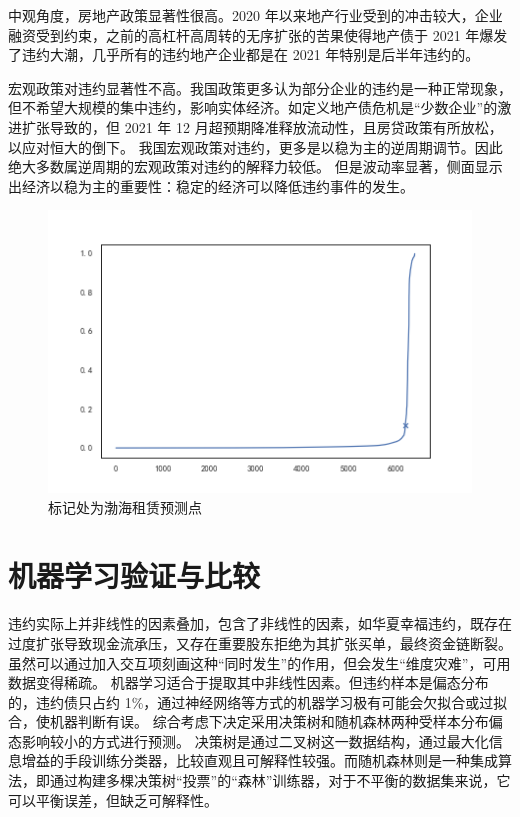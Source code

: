 中观角度，房地产政策显著性很高。2020 年以来地产行业受到的冲击较大，企业融资受到约束，之前的高杠杆高周转的无序扩张的苦果使得地产债于 2021 年爆发了违约大潮，几乎所有的违约地产企业都是在 2021 年特别是后半年违约的。

宏观政策对违约显著性不高。我国政策更多认为部分企业的违约是一种正常现象，但不希望大规模的集中违约，影响实体经济。如定义地产债危机是“少数企业”的激进扩张导致的，但 2021 年 12 月超预期降准释放流动性，且房贷政策有所放松，以应对恒大的倒下。
我国宏观政策对违约，更多是以稳为主的逆周期调节。因此绝大多数属逆周期的宏观政策对违约的解释力较低。
但是波动率显著，侧面显示出经济以稳为主的重要性：稳定的经济可以降低违约事件的发生。
\begin{figure}[h]
	\centering
	\includegraphics[width=0.9\linewidth]{./data/渤海银行.png}
	\caption{标记处为渤海租赁预测点}
	\label{fig:bhyh}
\end{figure}

\section{机器学习验证与比较}
违约实际上并非线性的因素叠加，包含了非线性的因素，如华夏幸福违约，既存在过度扩张导致现金流承压，又存在重要股东拒绝为其扩张买单，最终资金链断裂。虽然可以通过加入交互项刻画这种“同时发生”的作用，但会发生“维度灾难”，可用数据变得稀疏。
机器学习适合于提取其中非线性因素。但违约样本是偏态分布的，违约债只占约 1\%，通过神经网络等方式的机器学习极有可能会欠拟合或过拟合，使机器判断有误。
综合考虑下决定采用决策树和随机森林两种受样本分布偏态影响较小的方式进行预测。
决策树是通过二叉树这一数据结构，通过最大化信息增益的手段训练分类器，比较直观且可解释性较强。而随机森林则是一种集成算法，即通过构建多棵决策树“投票”的“森林”训练器，对于不平衡的数据集来说，它可以平衡误差，但缺乏可解释性。

